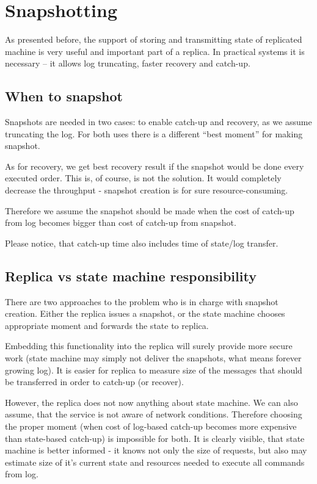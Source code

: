 \section{Snapshotting}
\label{sec:snapshotting}
As presented before, the support of storing and transmitting state of replicated machine is very useful and important part of a replica. In practical systems it is necessary -- it allows log truncating, faster recovery and catch-up.

\subsection{When to snapshot}
\label{subsec:when_to_snapshot}
Snapshots are needed in two cases: to enable catch-up and recovery, as we assume truncating the log. For both uses there is a different ``best moment'' for making snapshot.

As for recovery, we get best recovery result if the snapshot would be done every executed order.
This is, of course, is not the solution. It would completely decrease the throughput - snapshot creation is for sure resource-consuming.

Therefore we assume the snapshot should be made when the cost of catch-up from log becomes bigger than cost of catch-up from snapshot.

Please notice, that catch-up time also includes time of state/log transfer.

\subsection{Replica vs state machine responsibility}
\label{subsec:replica_vs_state_machine_responsibility}
There are two approaches to the problem who is in charge with snapshot creation. Either the replica issues a snapshot, or the state machine chooses appropriate moment and forwards the state to replica.

Embedding this functionality into the replica will surely provide more secure work (state machine may simply not deliver the snapshots, what means forever growing log). It is easier for replica to measure size of the messages that should be transferred in order to catch-up (or recover).

However, the replica does not now anything about state machine. We can also assume, that the service is not aware of network conditions. Therefore choosing the proper moment (when cost of log-based catch-up becomes more expensive than state-based catch-up) is impossible for both. It is clearly visible, that state machine is better informed - it knows not only the size of requests, but also may estimate size of it's current state and resources needed to execute all commands from log.

